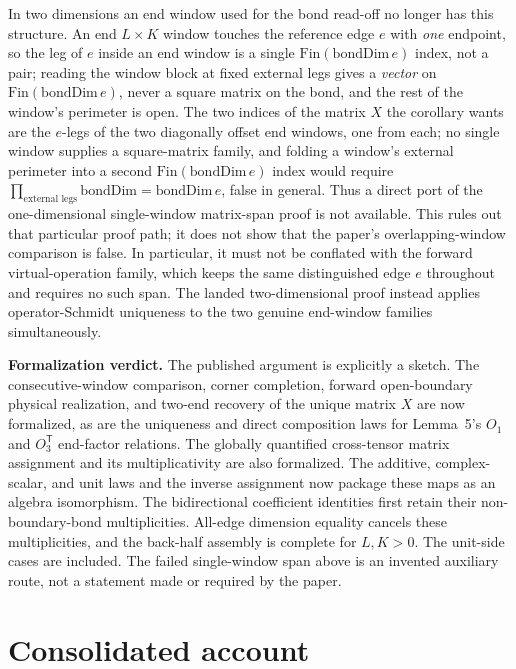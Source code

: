 \documentclass{article}
\begin{document}
In two dimensions an end window used for the bond read-off no longer has this
structure.  An end $L \times K$ window touches the reference edge $e$ with \emph{one}
endpoint, so the leg of $e$ inside an end window is a single
$\mathrm{Fin}(\mathrm{bondDim}\,e)$ index, not a pair; reading the window
block at fixed external legs gives a \emph{vector} on
$\mathrm{Fin}(\mathrm{bondDim}\,e)$, never a square matrix on the bond, and
the rest of the window's perimeter is open. The two indices of the matrix $X$
the corollary wants are the $e$-legs of the two diagonally offset end
windows, one from each; no single window supplies a square-matrix family, and
folding a window's external perimeter into a second
$\mathrm{Fin}(\mathrm{bondDim}\,e)$ index would require
$\prod_{\text{external legs}}\mathrm{bondDim} = \mathrm{bondDim}\,e$, false in
general.  Thus a direct port of the one-dimensional single-window matrix-span
proof is not available.  This rules out that particular proof path; it does
not show that the paper's overlapping-window comparison is false.  In
particular, it must not be conflated with the forward virtual-operation
family, which keeps the same distinguished edge $e$ throughout and requires
no such span.  The landed two-dimensional proof instead applies
operator-Schmidt uniqueness to the two genuine end-window families
simultaneously.

\medskip
\noindent\textbf{Formalization verdict.} The published argument is explicitly
a sketch.  The consecutive-window comparison, corner completion, forward
open-boundary physical realization, and two-end recovery of the unique matrix
$X$ are now formalized, as are the uniqueness and direct composition laws for
Lemma~5's $O_1$ and $O_3^{\mathsf T}$ end-factor relations.  The globally
quantified cross-tensor matrix assignment and its multiplicativity are also
formalized. The additive, complex-scalar, and unit laws and the inverse
assignment now package these maps as an algebra isomorphism. The
bidirectional coefficient identities first retain their non-boundary-bond
multiplicities. All-edge dimension equality cancels these multiplicities,
and the back-half assembly is complete for $L,K>0$.
The unit-side cases are included. The failed
single-window span above is an invented auxiliary route, not a statement made
or required by the paper.

\section{Consolidated account}
\end{document}
